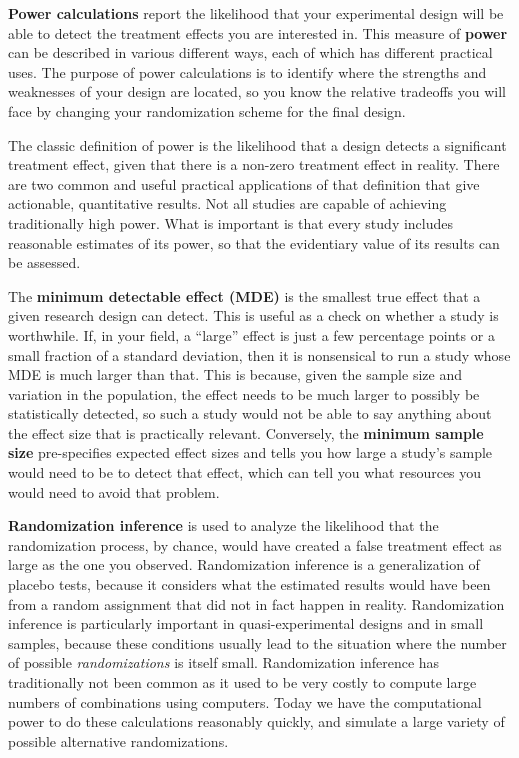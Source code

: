 \textbf{Power calculations} report the likelihood that your experimental design
will be able to detect the treatment effects you are interested in.
This measure of \textbf{power} can be described in various different ways,
each of which has different practical uses.
The purpose of power calculations is to identify where the strengths and weaknesses
of your design are located, so you know the relative tradeoffs you will face
by changing your randomization scheme for the final design.


The classic definition of power
is the likelihood that a design detects a significant treatment effect,
given that there is a non-zero treatment effect in reality.
There are two common and useful practical applications
of that definition that give actionable, quantitative results.
Not all studies are capable of achieving traditionally high power.
What is important is that every study includes reasonable estimates of its power,
so that the evidentiary value of its results can be assessed.

The \textbf{minimum detectable effect (MDE)}
is the smallest true effect that a given research design can detect.
This is useful as a check on whether a study is worthwhile.
If, in your field, a ``large'' effect is just a few percentage points
or a small fraction of a standard deviation,
then it is nonsensical to run a study whose MDE is much larger than that.
This is because, given the sample size and variation in the population,
the effect needs to be much larger to possibly be statistically detected,
so such a study would not be able to say anything about the effect size that is practically relevant.
Conversely, the \textbf{minimum sample size} pre-specifies expected effect sizes
and tells you how large a study's sample would need to be to detect that effect,
which can tell you what resources you would need to avoid that problem.



\textbf{Randomization inference} is used to analyze the likelihood
that the randomization process, by chance,
would have created a false treatment effect as large as the one you observed.
Randomization inference is a generalization of placebo tests,
because it considers what the estimated results would have been
from a random assignment that did not in fact happen in reality.
Randomization inference is particularly important
in quasi-experimental designs and in small samples,
because these conditions usually lead to the situation
where the number of possible \textit{randomizations} is itself small.
Randomization inference has traditionally not been common
as it used to be very costly to compute large numbers of combinations using computers.
Today we have the computational power to do these calculations reasonably quickly,
and simulate a large variety of possible alternative randomizations.


